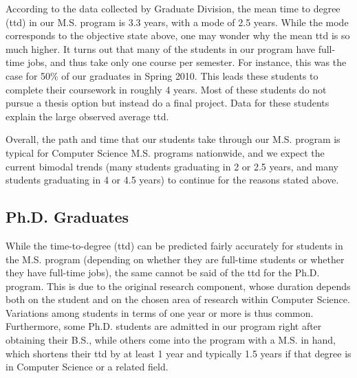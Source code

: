 \documentclass[12pt]{article}
\begin{document}
According to the data collected by Graduate Division, the mean time to
degree (ttd) in our M.S. program is 3.3 years, with a mode of 2.5
years. While the mode corresponds to the objective state above, one may
wonder why the mean ttd is so much higher. It turns out that many of
the students in our program have full-time jobs, and thus take only
one course per semester. For instance, this was the case for 50\%
of our graduates in Spring 2010. This leads these students to complete
their coursework in roughly 4 years. Most of these students do not
pursue a thesis option but instead do a final project.  Data for these students
explain the large observed average ttd.

Overall, the path and time that our students take through our M.S.
program is typical for Computer Science M.S. programs nationwide, and
we expect the current bimodal trends (many students graduating in 2 or
2.5 years, and many students graduating in 4 or 4.5 years) to continue
for the reasons stated above.

\subsection{Ph.D. Graduates}
\label{sec.time.phd}

While the time-to-degree (ttd) can be predicted fairly accurately for
students in the M.S. program (depending on whether they are full-time
students or whether they have full-time jobs), the same cannot be said
of the ttd for the Ph.D. program. This is due to the original research
component, whose duration depends both on the student and on the
chosen area of research within Computer Science. Variations among
students in terms of one year or more is thus common. Furthermore,
some Ph.D.  students are admitted in our program right after obtaining
their B.S., while others come into the program with a M.S. in hand,
which shortens their ttd by at least 1 year and typically 1.5 years if
that degree is in Computer Science or a related field.
\end{document}
